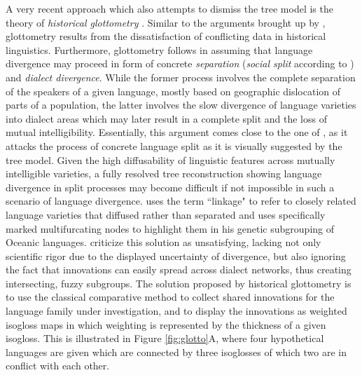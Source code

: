 \documentclass[svgnames,12pt]{scrartcl}
\begin{document}
{{A very recent approach which also attempts to dismiss the tree model is the theory of
\emph{historical glottometry} \citep{Francois2015,Kalyan2016}. Similar to the arguments brought up
by \citet{Schmidt1872}, glottometry results from the dissatisfaction of conflicting data in
historical linguistics.  Furthermore, glottometry follows \citet{Ross1988} in assuming that language
divergence may proceed in form of concrete \emph{separation} (\emph{social split} according to
\citealt{Francois2015}) and \emph{dialect divergence}. While the former process involves the
complete separation of the speakers of a given language, mostly based on geographic dislocation of
parts of a population, the latter involves the slow divergence of language varieties into dialect
areas which may later result in a complete split and the loss of mutual intelligibility.
Essentially, this argument comes close to the one of \citet{Schuchardt1870}, as it attacks the
process of concrete language split as it is visually suggested by the tree model. Given the high
diffusability of linguistic features across mutually intelligible varieties, a fully resolved tree
reconstruction showing language divergence in split processes may become difficult if not impossible
in such a scenario of language divergence. \citet{Ross1988} uses the term ``linkage" to refer to
closely related language varieties that diffused rather than separated and uses specifically marked
multifurcating nodes to highlight them in his genetic subgrouping of Oceanic languages.
\citet{Kalyan2016} criticize this solution as unsatisfying, lacking not only scientific rigor due
to the displayed uncertainty of divergence, but also ignoring the fact that innovations can easily
spread across dialect networks, thus creating intersecting, fuzzy subgroups. The solution proposed
by historical glottometry is to use the classical comparative method to collect shared innovations
for the language family under investigation, and to display the innovations as weighted isogloss
maps in which weighting is represented by the thickness of a given isogloss. This is illustrated in
Figure \ref{fig:glotto}A, where four hypothetical languages are given which are connected by three
isoglosses of which two are in conflict with each other.

}}
\end{document}
